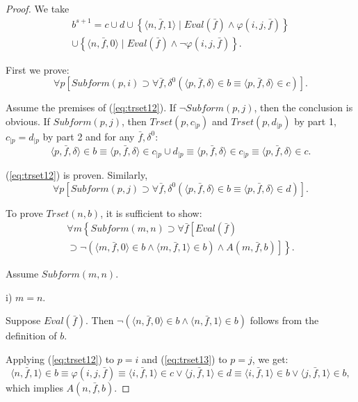 \documentclass{asl}
\theoremstyle{definition}
\begin{document}
\begin{proof}
We take 
\begin{multline*}
b^{s+1}=c\cup d\cup\left\lbrace \langle n,\bar{f},1\rangle\mid Eval(\bar{f})\wedge\varphi( i,j,\bar{f})\right\rbrace 
\\
\cup
\left\lbrace \langle n,\bar{f},0\rangle\mid Eval(\bar{f})\wedge\neg\varphi( i,j,\bar{f})\right\rbrace .
\end{multline*}

First we prove:
\begin{equation}
\forall p\left[Subform(p,i)\supset \forall \bar{f},\delta^0\left(\langle p,\bar{f},\delta\rangle\in b\equiv\langle  p,\bar{f},\delta\rangle\in c \right) \right].
\label{eq:trset12}
\end{equation}

Assume the premises of (\ref{eq:trset12}). If $\neg Subform(p,j)$, then the conclusion is obvious. If $Subform(p,j)$, then $Trset(p,c_{\mid p})$ and $Trset(p,d_{\mid p})$ by part 1, $c_{\mid p}=d_{\mid p}$ by part 2 and for any $\bar{f},\delta^0$:
\[\langle p,\bar{f},\delta\rangle\in b\equiv
\langle p,\bar{f},\delta\rangle\in c_{\mid p}\cup d_{\mid p} \equiv\langle p,\bar{f},\delta\rangle\in c_{\mid p}\equiv\langle p,\bar{f},\delta\rangle\in c.\]

(\ref{eq:trset12}) is proven. Similarly,
\begin{equation}
\forall p\left[Subform(p,j)\supset \forall \bar{f},\delta^0\left(\langle p,\bar{f},\delta\rangle\in b\equiv\langle  p,\bar{f},\delta\rangle\in d \right) \right].
\label{eq:trset13}
\end{equation}

To prove $Trset(n,b)$, it is sufficient to show:
\begin{multline}
\forall m\left\lbrace Subform(m,n)\supset\forall\bar{f}\left[Eval(\bar{f})
\right.
\right.
\\
\left.
\left.
\supset
\neg(\langle m,\bar{f},0\rangle\in b\wedge\langle m,\bar{f},1\rangle\in b)\wedge A(m,\bar{f},b)\right]\right\rbrace .
\label{eq:trset14}
\end{multline}

Assume $Subform(m,n)$.

i) $m=n$.

Suppose $Eval(\bar{f})$. Then $\neg(\langle n,\bar{f},0\rangle\in b\wedge\langle n,\bar{f},1\rangle\in b)$ follows from the definition of $b$.

Applying (\ref{eq:trset12}) to $p=i$ and (\ref{eq:trset13}) to $p=j$, we get:
\[\langle n,\bar{f},1\rangle\in b\equiv\varphi(i,j,\bar{f})
\equiv\langle i,\bar{f},1\rangle\in c\vee \langle j,\bar{f},1\rangle\in d 
\equiv \langle i,\bar{f},1\rangle\in b\vee \langle j,\bar{f},1\rangle\in b,\]
which implies $A(n,\bar{f},b)$.


\end{proof}
\end{document}
